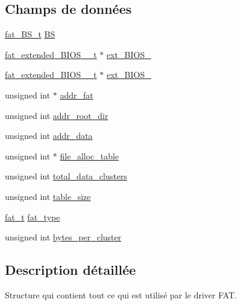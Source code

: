 \subsection*{Champs de données}
\begin{DoxyCompactItemize}
\item 
\hyperlink{fat__internal_8h_a2fa84596abf5ea3bd6f27951a77333c5}{fat\+\_\+\+B\+S\+\_\+t} \hyperlink{struct__fat__info_adcd12930a4a7f94ecac42ba82567adb7}{B\+S}
\item 
\hyperlink{fat__internal_8h_a017a64d5b6e25780d01109008245c15c}{fat\+\_\+extended\+\_\+\+B\+I\+O\+S\+\_\+\_\+t} $\ast$ \hyperlink{struct__fat__info_a4da4c2a7a629ca59a686822e6447acb8}{ext\+\_\+\+B\+I\+O\+S\+\_}
\item 
\hyperlink{fat__internal_8h_ac3feb4afc4c75c10410e9e867e3f99e8}{fat\+\_\+extended\+\_\+\+B\+I\+O\+S\+\_\+\_\+t} $\ast$ \hyperlink{struct__fat__info_aab203e7eb3c2027e3034d7765a2d5281}{ext\+\_\+\+B\+I\+O\+S\+\_}
\item 
unsigned int $\ast$ \hyperlink{struct__fat__info_a0344193eb413dce4369b6e36ed03b92b}{addr\+\_\+fat}
\item 
unsigned int \hyperlink{struct__fat__info_ae9133d320e0afc89c5e6cc9cedf6dfb5}{addr\+\_\+root\+\_\+dir}
\item 
unsigned int \hyperlink{struct__fat__info_a4cb2766e74dd65f24d4eb30ce3b49302}{addr\+\_\+data}
\item 
unsigned int $\ast$ \hyperlink{struct__fat__info_a27195d09eb1dcd65d35d7b312d1bec0b}{file\+\_\+alloc\+\_\+table}
\item 
unsigned int \hyperlink{struct__fat__info_ab43681d4b5c7cf719cd6c934cada39e3}{total\+\_\+data\+\_\+clusters}
\item 
unsigned int \hyperlink{struct__fat__info_af110757af771c0f3fe0c515cca1ff177}{table\+\_\+size}
\item 
\hyperlink{fat__internal_8h_aea47744930623076e66d2f155e12ca24}{fat\+\_\+t} \hyperlink{struct__fat__info_af9e994d6d2c5211614ca61cfa4492500}{fat\+\_\+type}
\item 
unsigned int \hyperlink{struct__fat__info_ac1ba92d928512827ab7978f136efda96}{bytes\+\_\+per\+\_\+cluster}
\end{DoxyCompactItemize}


\subsection{Description détaillée}
Structure qui contient tout ce qui est utilisé par le driver F\+A\+T. 

